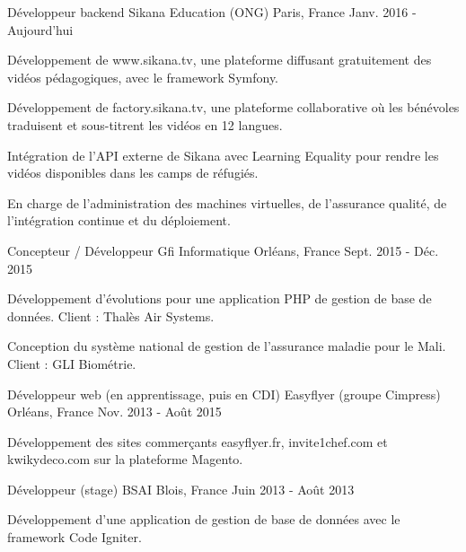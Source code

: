 \begin{cventries}
  \cventry
    {Développeur backend}
    {Sikana Education (ONG)}
    {Paris, France}
    {Janv. 2016 - Aujourd'hui}
    {
      \begin{cvitems}
        \item {Développement de www.sikana.tv, une plateforme diffusant gratuitement des vidéos pédagogiques, avec le framework Symfony.}
        \item {Développement de factory.sikana.tv, une plateforme collaborative où les bénévoles traduisent et sous-titrent les vidéos en 12 langues.}
        \item {Intégration de l'API externe de Sikana avec Learning Equality pour rendre les vidéos disponibles dans les camps de réfugiés.}
        \item {En charge de l'administration des machines virtuelles, de l'assurance qualité, de l'intégration continue et du déploiement.}
      \end{cvitems}
    }
  \cventry
    {Concepteur / Développeur}
    {Gfi Informatique}
    {Orléans, France}
    {Sept. 2015 - Déc. 2015}
    {
      \begin{cvitems}
        \item {Développement d'évolutions pour une application PHP de gestion de base de données. Client : Thalès Air Systems.}
        \item {Conception du système national de gestion de l'assurance maladie pour le Mali. Client : GLI Biométrie.}
      \end{cvitems}
    }
  \cventry
    {Développeur web (en apprentissage, puis en CDI)}
    {Easyflyer (groupe Cimpress)}
    {Orléans, France}
    {Nov. 2013 - Août 2015}
    {
      \begin{cvitems}
        \item {Développement des sites commerçants easyflyer.fr, invite1chef.com et kwikydeco.com sur la plateforme Magento.}
      \end{cvitems}
    }
  \cventry
    {Développeur (stage)}
    {BSAI}
    {Blois, France}
    {Juin 2013 - Août 2013}
    {
      \begin{cvitems}
        \item {Développement d'une application de gestion de base de données avec le framework Code Igniter.}
      \end{cvitems}
    }
\end{cventries}
